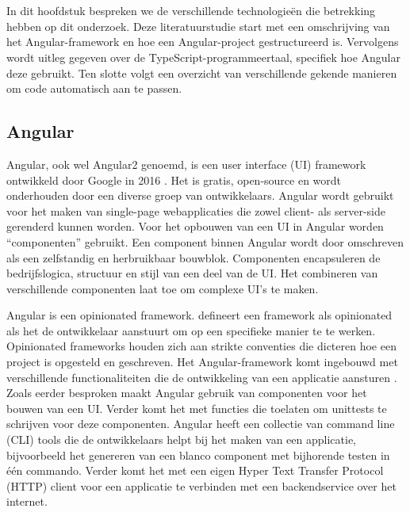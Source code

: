 \chapter{}%
\label{ch:stand-van-zaken}

In dit hoofdstuk bespreken we de verschillende technologieën die betrekking hebben op dit onderzoek.
Deze literatuurstudie start met een omschrijving van het Angular-framework en hoe een Angular-project gestructureerd is.
Vervolgens wordt uitleg gegeven over de TypeScript-programmeertaal, specifiek hoe Angular deze gebruikt.
Ten slotte volgt een overzicht van verschillende gekende manieren om code automatisch aan te passen.

\section{Angular}
\label{ch:stand-van-zaken:angular}

Angular, ook wel Angular2 genoemd, is een user interface (UI) framework ontwikkeld door Google in 2016 \autocite{Cincovic2019}.
Het is gratis, open-source en wordt onderhouden door een diverse groep van ontwikkelaars.
Angular wordt gebruikt voor het maken van single-page webapplicaties die zowel client- als server-side gerenderd kunnen worden.
Voor het opbouwen van een UI in Angular worden ``componenten'' gebruikt.
Een component binnen Angular wordt door \textcite{Kaufman2016} omschreven als een zelfstandig en herbruikbaar bouwblok.
Componenten encapsuleren de bedrijfslogica, structuur en stijl van een deel van de UI.
Het combineren van verschillende componenten laat toe om complexe UI's te maken.

Angular is een opinionated framework.
\textcite{Parker2017} defineert een framework als opinionated als het de ontwikkelaar aanstuurt om op een specifieke manier te te werken.
Opinionated frameworks houden zich aan strikte conventies die dicteren hoe een project is opgesteld en geschreven.
Het Angular-framework komt ingebouwd met verschillende functionaliteiten die de ontwikkeling van een applicatie aansturen \autocite{Wilken2018}.
Zoals eerder besproken maakt Angular gebruik van componenten voor het bouwen van een UI.
Verder komt het met functies die toelaten om unittests te schrijven voor deze componenten.
Angular heeft een collectie van command line (CLI) tools die de ontwikkelaars helpt bij het maken van een applicatie, bijvoorbeeld het genereren van een blanco component met bijhorende testen in één commando.
Verder komt het met een eigen Hyper Text Transfer Protocol (HTTP) client voor een applicatie te verbinden met een backendservice over het internet.

